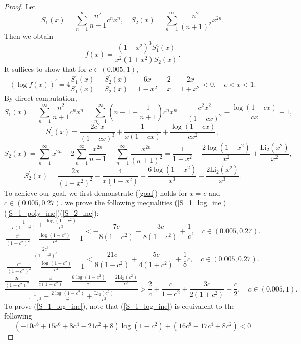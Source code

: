 ﻿\documentclass[10pt]{article}
\begin{document}
\begin{proof}
Let 
$$S_1(x) = \sum_{n=1}^{\infty}\frac{n^{2}}{n+1}c^{n}x^{n},\quad S_2(x) = \sum_{n=1}^{\infty}\frac{n^{2}}{(n+1)^{2}}x^{2n}.$$
Then we obtain 
$$f(x) = \frac{(1-x^2)^{3}S_1^{4}(x)}{x^{2}(1+x^{2})S_2(x)}.
$$
It suffices to show that for $c\in(0.005, 1)$,
\begin{equation}
    \left(\log f(x)\right)^{'} = 4\frac{S_1^{'}(x)}{S_1(x)}-\frac{S_2^{'}(x)}{S_2(x)}-\frac{6x}{1-x^2}-\frac{2}{x}-\frac{2x}{1+x^2}<0, \quad c<x<1.
    \label{goal}
\end{equation}
By direct computation,
$$S_1(x) = \sum_{n=1}^{\infty}\frac{n^{2}}{n+1}c^{n}x^{n} = \sum_{n=1}^{\infty}\left(n-1+\frac{1}{n+1}\right)c^{n}x^{n} = \frac{c^2 x^2}{(1-cx)^2}-\frac{\log(1-cx)}{cx}-1,
$$
$$S_1^{'}(x) = \frac{2c^2 x}{(1-cx)^{3}}+\frac{1}{x(1-cx)}+\frac{\log(1-cx)}{cx^2},
$$
$$S_2(x) = \sum_{n=1}^{\infty}x^{2n}-2\sum_{n=1}^{\infty}\frac{x^{2n}}{n+1}+\sum_{n=1}^{\infty}\frac{x^{2n}}{(n+1)^2}=\frac{1}{1-x^2}+\frac{2\log(1-x^2)}{x^2}+\frac{\text{Li}_2(x^2)}{x^2},
$$
$$S_2^{'}(x) = \frac{2x}{(1-x^2)^2}-\frac{4}{x(1-x^2)}-\frac{6\log(1-x^2)}{x^3}-\frac{2\text{Li}_2(x^2)}{x^3}.
$$
To achieve our goal, we first demonstrate (\ref{goal}) holds for $x=c$ and $c\in(0.005, 0.27)$. we prove the following inequalities (\ref{S_1_log_ine})(\ref{S_1_poly_ine})(\ref{S_2_ine}):
\begin{equation}
    \frac{\frac{1}{c(1-c^2)}+\frac{\log(1-c^2)}{c^3}}{\frac{c^4}{(1-c^2)^{2}}-\frac{\log(1-c^2)}{c^2}-1}<-\frac{7c}{8(1-c^2)}-\frac{3c}{8(1+c^2)}+\frac{1}{c}, \quad c\in(0.005, 0.27).\label{S_1_log_ine}
\end{equation}
\begin{equation}
    \frac{\frac{2c^3}{(1-c^2)^3}}{\frac{c^4}{(1-c^2)^{2}}-\frac{\log(1-c^2)}{c^2}-1}<\frac{21c}{8(1-c^2)}+\frac{5c}{4(1+c^2)}+\frac{1}{8}c, \quad c\in(0.005, 0.27).\label{S_1_poly_ine}
\end{equation}
\begin{equation}
    \frac{\frac{2c}{(1-c^2)^2}-\frac{4}{c(1-c^2)}-\frac{6\log(1-c^2)}{c^3}-\frac{2\text{Li}_2(c^2)}{c^3}}{\frac{1}{1-c^2}+\frac{2\log(1-c^2)}{c^2}+\frac{\text{Li}_2(c^2)}{c^2}}>\frac{2}{c}+\frac{c}{1-c^2}+\frac{3c}{2(1+c^2)}+\frac{c}{2}, \quad c\in(0.005, 1).\label{S_2_ine}
\end{equation}
To prove (\ref{S_1_log_ine}), note that (\ref{S_1_log_ine}) is equivalent to the following
\begin{equation}
    (-10c^8+15c^6+8c^4-21c^2+8)\log(1 - c^2)+ (  16c^8 - 17c^4+8c^2)<0
\end{equation}

\end{proof}
\end{document}
